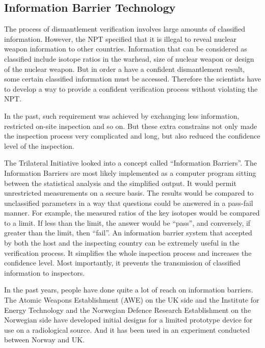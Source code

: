 \documentclass[twoside,titlepage,11pt,twocolumn,a4paper]{article}
\begin{document}
\subsection{Information Barrier Technology}
The process of dismantlement verification involves large amounts of
classified information. However, the NPT specified that it is illegal
to reveal nuclear weapon information to other countries. Information
that can be considered as classified include isotope ratios in the
warhead, size of nuclear weapon or design of the nuclear weapon. But
in order a have a confident dismantlement result, some certain
classified information must be accessed. Therefore the scientists have
to develop a way to provide a confident verification process without
violating the NPT.

In the past, such requirement was achieved by exchanging less
information, restricted on-site inspection and so on. But these extra
constrains not only made the inspection process very complicated and
long, but also reduced the confidence level of the inspection.

The Trilateral Initiative looked into a concept called ``Information
Barriers''. The Information Barriers are most likely implemented as a
computer program sitting between the statistical analysis and the
simplified output. It would permit unrestricted measurements on a
secure basis. The results would be compared to unclassified parameters
in a way that questions could be answered in a pass-fail
manner. \citep{SUW2005} For example, the measured ratios of the key
isotopes would be compared to a limit. If less than the limit, the
answer would be ``pass'', and conversely, if greater than the limit,
then ``fail''. An information barrier system that accepted by both the
host and the inspecting country can be extremely useful in the
verification process. It simplifies the whole inspection process and
increases the confidence level. Most importantly, it prevents the
transmission of classified information to inspectors.


In the past years, people have done quite a lot of reach on
information barriers. The Atomic Weapons Establishment (AWE) on the UK 
side and the Institute for
Energy Technology and the Norwegian Defence Research Establishment on
the Norwegian side have developed initial designs for a limited
prototype device for use on a radiological source. And it has been
used in an experiment conducted between Norway and UK.
\end{document}
